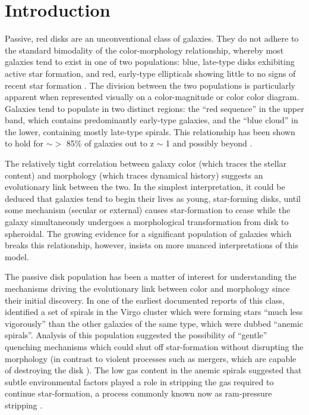 \documentclass[useAMS,usenatbib]{mn2e}
\begin{document}
\section{Introduction}
\label{sec:Intro}

Passive, red disks are an unconventional class of galaxies. They do not adhere to the standard bimodality of the color-morphology relationship, whereby most galaxies tend to exist in one of two populations: blue, late-type disks exhibiting active star formation, and red, early-type ellipticals showing little to no signs of recent star formation \citep{Strateva2001, Baldry2004, Correa2017}. The division between the two populations is particularly apparent when represented visually on a color-magnitude or color color diagram. Galaxies tend to populate in two distinct regions: the ``red sequence'' in the upper band, which contains predominantly early-type galaxies, and the ``blue cloud'' in the lower, containing mostly late-type spirals. This relationship has been shown to hold for $\sim >$ 85\% of galaxies out to z $\sim$ 1 \citep{Bell2004,Cirasuolo2007,Mignoli2009} and possibly beyond \citep{Giallongo2005, vanDokkum2006, Franzetti2007, Cassata2008}. 

The relatively tight correlation between galaxy color (which traces the stellar content) and morphology (which traces dynamical history) suggests an evolutionary link between the two. In the simplest interpretation, it could be deduced that galaxies tend to begin their lives as young, star-forming disks, until some mechanism (secular or external) causes star-formation to cease while the galaxy simultaneously undergoes a morphological transformation from disk to spheroidal. The growing evidence for a significant population of galaxies which breaks this relationship, however, insists on more nuanced interpretations of this model. 

The passive disk population has been a matter of interest for understanding the mechanisms driving the evolutionary link between color and morphology since their initial discovery.  In one of the earliest documented reports of this class, \citet{VandenBergh1976} identified a set of spirals in the Virgo cluster which were forming stars ``much less vigorously'' than the other galaxies of the same type, which were dubbed ``anemic spirals''. Analysis of this population suggested the possibility of ``gentle'' quenching mechanisms which could shut off star-formation without disrupting the morphology (in contrast to violent processes such as mergers, which are capable of destroying the disk \citep{Bell2004,Negroponte1983,DeLucia2006,Springel2005}). The low gas content in the anemic spirals suggested that subtle environmental factors played a role in stripping the gas required to continue star-formation, a process commonly known now as ram-pressure stripping \citep{Gunn1972,Steinhauser2016}. 
\end{document}
